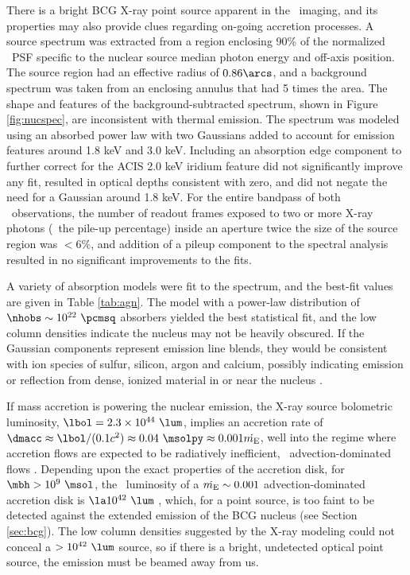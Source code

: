 \documentclass[apjpt4]{aastex}
\begin{document}
There is a bright BCG X-ray point source apparent in the
\cxo\ imaging, and its properties may also provide clues regarding
on-going accretion processes. A source spectrum was extracted from a
region enclosing 90\% of the normalized \cxo\ PSF specific to the
nuclear source median photon energy and off-axis position. The source
region had an effective radius of $0.86\arcs$, and a background
spectrum was taken from an enclosing annulus that had 5 times the
area. The shape and features of the background-subtracted spectrum,
shown in Figure \ref{fig:nucspec}, are inconsistent with thermal
emission. The spectrum was modeled using an absorbed power law with
two Gaussians added to account for emission features around 1.8 keV
and 3.0 keV. Including an absorption edge component to further correct
for the ACIS 2.0 keV iridium feature did not significantly improve any
fit, resulted in optical depths consistent with zero, and did not
negate the need for a Gaussian around 1.8 keV. For the entire bandpass
of both \cxo\ observations, the number of readout frames exposed to
two or more X-ray photons (\ie\ the pile-up percentage) inside an
aperture twice the size of the source region was $< 6\%$, and addition
of a pileup component to the spectral analysis resulted in no
significant improvements to the fits.

A variety of absorption models were fit to the spectrum, and the
best-fit values are given in Table \ref{tab:agn}. The model with a
power-law distribution of $\nhobs \sim 10^{22} ~\pcmsq$ absorbers
yielded the best statistical fit, and the low column densities
indicate the nucleus may not be heavily obscured. If the Gaussian
components represent emission line blends, they would be consistent
with ion species of sulfur, silicon, argon and calcium, possibly
indicating emission or reflection from dense, ionized material in or
near the nucleus \citep[\eg][]{1990ApJ...362...90B,
  1998MNRAS.297.1219I}.

If mass accretion is powering the nuclear emission, the X-ray source
bolometric luminosity, $\lbol = 2.3 \times 10^{44} ~\lum$, implies an
accretion rate of $\dmacc \approx \lbol/(0.1 c^2) \approx 0.04
~\msolpy \approx 0.001 \dme$, well into the regime where accretion
flows are expected to be radiatively inefficient,
\eg\ advection-dominated flows \citep{adaf}. Depending upon the exact
properties of the accretion disk, for $\mbh > 10^9 ~\msol$, the
\hbeta\ luminosity of a $\dot{m_{\rm{E}}} \sim 0.001$ advection-dominated
accretion disk is $\la 10^{42} ~\lum$ \citep{2002ApJ...570L..13C},
which, for a point source, is too faint to be detected against the
extended emission of the BCG nucleus (see Section \ref{sec:bcg}). The
low column densities suggested by the X-ray modeling could not conceal
a $> 10^{42} ~\lum$ source, so if there is a bright, undetected
optical point source, the emission must be beamed away from us.
\end{document}
